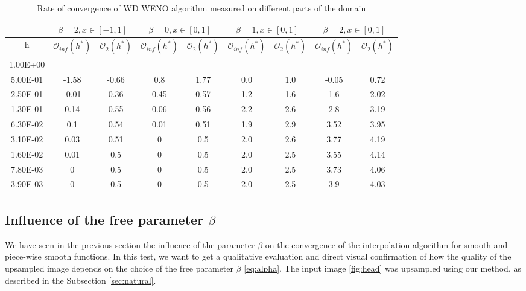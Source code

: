 	
	 \begin{table}
	\centering\footnotesize
	\begin{tabular}{c|cc|cc|cc|cc}
		 &\multicolumn{2}{c}{$\beta=2,x\in[-1,1]$}& \multicolumn{2}{c}{$\beta=0,x\in[0,1]$}  &\multicolumn{2}{c}{$\beta=1,x\in[0,1]$}&\multicolumn{2}{c}{$\beta=2,x\in[0,1]$}  \\
	\hline	
	h	&	$\mathcal{O}_{inf} (h^*)$	&	$\mathcal{O}_2 (h^*)$	&	$\mathcal{O}_{inf} (h^*)$	&	$\mathcal{O}_2 (h^*)$	&	$\mathcal{O}_{inf} (h^*)$	&	$\mathcal{O}_2 (h^*)$&	$\mathcal{O}_{inf} (h^*)$	&	$\mathcal{O}_2 (h^*)$\\
	\hline
1.00E+00	&		&		&		&		&		&		&		&		\\
5.00E-01	&	-1.58	&	-0.66	&	0.8	&	1.77	&	0.0	&	1.0	&	-0.05	&	0.72	\\
2.50E-01	&	-0.01	&	0.36	&	0.45	&	0.57	&	1.2	&	1.6	&	1.6	&	2.02	\\
1.30E-01	&	0.14	&	0.55	&	0.06	&	0.56	&	2.2	&	2.6	&	2.8	&	3.19	\\
6.30E-02	&	0.1	&	0.54	&	0.01	&	0.51	&	1.9	&	2.9	&	3.52	&	3.95	\\
3.10E-02	&	0.03	&	0.51	&	0	&	0.5	&	2.0	&	2.6	&	3.77	&	4.19	\\
1.60E-02	&	0.01	&	0.5	&	0	&	0.5	&	2.0	&	2.5	&	3.55	&	4.14	\\
7.80E-03	&	0	&	0.5	&	0	&	0.5	&	2.0	&	2.5	&	3.73	&	4.06	\\
3.90E-03	&	0	&	0.5	&	0	&	0.5	&	2.0	&	2.5	&	3.9	&	4.03	\\
	\hline			
	\end{tabular}
	\caption{Rate of convergence of {WD} WENO algorithm measured on different parts of the domain}
	\label{tab:convergenceDiscontinuity}
	\end{table}
	
\subsection{Influence of the free parameter $\beta$}
We have seen in the previous section the influence of the parameter $\beta$ on the convergence of the interpolation algorithm for smooth and piece-wise smooth functions.
In this test, we want to get a qualitative evaluation and direct visual confirmation of how the quality of the upsampled image depends on the choice of the free parameter $\beta$ \eqref{eq:alpha}.
The input image \ref{fig:head} was upsampled using our method, as described in the Subsection \ref{sec:natural}.

